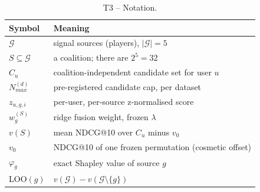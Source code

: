 \begin{table}[htbp]
\centering
\footnotesize
\caption{T3 -- Notation.}
\label{tab:T3_notation}
\begin{tabular}{ll}
\toprule
Symbol & Meaning \\
\midrule
$\mathcal{G}$ & signal sources (players), $|\mathcal{G}|=5$ \\
$S \subseteq \mathcal{G}$ & a coalition; there are $2^5=32$ \\
$C_u$ & coalition-independent candidate set for user $u$ \\
$N_{max}^{(d)}$ & pre-registered candidate cap, per dataset \\
$z_{u,g,i}$ & per-user, per-source z-normalised score \\
$w_g^{(S)}$ & ridge fusion weight, frozen $\lambda$ \\
$v(S)$ & mean NDCG@10 over $C_u$ minus $v_0$ \\
$v_0$ & NDCG@10 of one frozen permutation (cosmetic offset) \\
$\varphi_g$ & exact Shapley value of source $g$ \\
LOO$(g)$ & $v(\mathcal{G}) - v(\mathcal{G} \setminus \{g\})$ \\
\bottomrule
\end{tabular}
\end{table}
